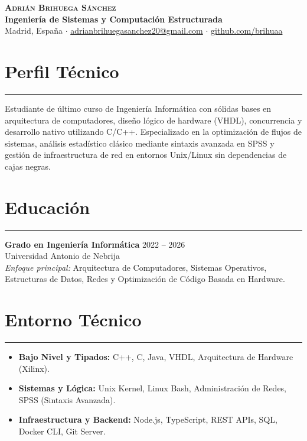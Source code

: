 \documentclass[11pt,a4paper]{article}
\begin{document}
\pagestyle{empty}

\begin{center}
    {\Huge \textbf{\textsc{Adrián Brihuega Sánchez}}} \\ \vspace{4pt}
    {\color{accent} \large \textbf{Ingeniería de Sistemas y Computación Estructurada}} \\ \vspace{6pt}
    {\color{muted} Madrid, España \quad $\cdot$ \quad \href{mailto:adrianbrihuegasanchez20@gmail.com}{adrianbrihuegasanchez20@gmail.com} \quad $\cdot$ \quad \href{https://github.com/brihuaa}{github.com/brihuaa}}
\end{center}

\vspace{15pt}

\section*{Perfil Técnico}
\hrule
\vspace{6pt}
Estudiante de último curso de Ingeniería Informática con sólidas bases en arquitectura de computadores, diseño lógico de hardware (VHDL), concurrencia y desarrollo nativo utilizando C/C++. Especializado en la optimización de flujos de sistemas, análisis estadístico clásico mediante sintaxis avanzada en SPSS y gestión de infraestructura de red en entornos Unix/Linux sin dependencias de cajas negras.

\vspace{10pt}

\section*{Educación}
\hrule
\vspace{6pt}
\textbf{Grado en Ingeniería Informática} \hfill 2022 -- 2026 \\
Universidad Antonio de Nebrija \\
\textit{Enfoque principal:} Arquitectura de Computadores, Sistemas Operativos, Estructuras de Datos, Redes y Optimización de Código Basada en Hardware.

\vspace{10pt}

\section*{Entorno Técnico}
\hrule
\vspace{6pt}
\begin{itemize}[leftmargin=*, noitemsep]
    \item \textbf{Bajo Nivel y Tipados:} C++, C, Java, VHDL, Arquitectura de Hardware (Xilinx).
    \item \textbf{Sistemas y Lógica:} Unix Kernel, Linux Bash, Administración de Redes, SPSS (Sintaxis Avanzada).
    \item \textbf{Infraestructura y Backend:} Node.js, TypeScript, REST APIs, SQL, Docker CLI, Git Server.
\end{itemize}
\end{document}

